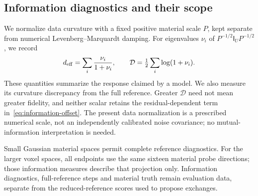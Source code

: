 \subsection{Information diagnostics and their scope}
We normalize data curvature with a fixed positive material scale $P$, kept separate from numerical Levenberg--Marquardt damping. For eigenvalues $\nu_i$ of $P^{-1/2}\mathsf I_UP^{-1/2}$, we record
\begin{equation}
 d_{\rm eff}=
 \sum_i\frac{\nu_i}{1+\nu_i},\qquad
 \mathcal D=\tfrac12\sum_i\log(1+\nu_i).
\end{equation}
These quantities summarize the response claimed by a model. We also measure its curvature discrepancy from the full reference. Greater $\mathcal D$ need not mean greater fidelity, and neither scalar retains the residual-dependent term in~\eqref{eq:information-offset}. The present data normalization is a prescribed numerical scale, not an independently calibrated noise covariance; no mutual-information interpretation is needed.

Small Gaussian material spaces permit complete reference diagnostics. For the larger voxel spaces, all endpoints use the same sixteen material probe directions; those information measures describe that projection only. Information diagnostics, full-reference steps and material truth remain evaluation data, separate from the reduced-reference scores used to propose exchanges.

